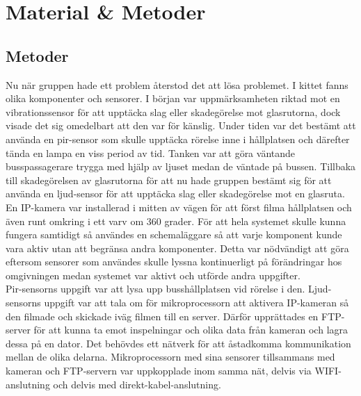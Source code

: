 



\chapter{Material \& Metoder} %
\label{ch:metoder}


\ifpdf
    \graphicspath{{8/figures/PNG/}{8_materials_and_methods/figures/PDF/}{8_materials_and_methods/figures/}}
\else
    \graphicspath{{8/figures/EPS/}{8_materials_and_methods/figures/}}
\fi




\section{Metoder}
Nu när gruppen hade ett problem återstod det att lösa problemet. I kittet fanns olika komponenter och sensorer. I början var uppmärksamheten riktad mot en vibrationssensor för att upptäcka slag eller skadegörelse mot glasrutorna, dock visade det sig omedelbart att den var för känslig. Under tiden var det bestämt att använda en pir-sensor som skulle upptäcka rörelse inne i hållplatsen och därefter tända en lampa en viss period av tid. Tanken var att göra väntande busspassagerare trygga med hjälp av ljuset medan de väntade på bussen. Tillbaka till skadegörelsen av glasrutorna för att nu hade gruppen bestämt sig för att använda en ljud-sensor för att upptäcka slag eller skadegörelse mot en glasruta. En IP-kamera var installerad i mitten av vägen för att först filma hållplatsen och även runt omkring i ett varv om 360 grader. 
För att hela systemet skulle kunna fungera samtidigt så användes en schemaläggare så att varje komponent kunde vara aktiv utan att begränsa andra komponenter. Detta var nödvändigt att göra eftersom sensorer som användes skulle lyssna kontinuerligt på förändringar hos omgivningen medan systemet var aktivt och utförde andra uppgifter.\\

Pir-sensorns uppgift var att lysa upp busshållplatsen vid rörelse i den. Ljud-sensorns uppgift var att tala om för mikroprocessorn att aktivera IP-kameran så den filmade och skickade iväg filmen till en server. Därför upprättades en FTP-server för att kunna ta emot inspelningar och olika data från kameran och lagra dessa på en dator. Det behövdes ett nätverk för att åstadkomma kommunikation mellan de olika delarna. Mikroprocessorn med sina sensorer tillsammans med kameran och FTP-servern var uppkopplade inom samma nät, delvis via WIFI-anslutning och delvis med direkt-kabel-anslutning.

